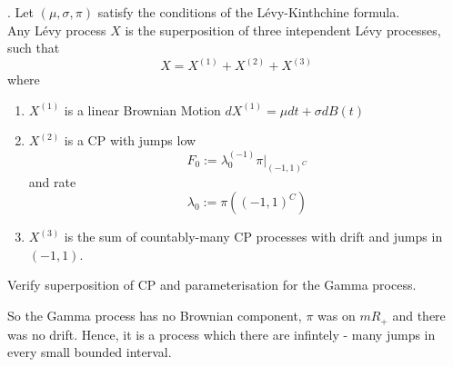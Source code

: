 \documentclass{article}
\begin{document}
	\begin{theorem}
		. Let $(\mu, \sigma, \pi)$ satisfy the conditions of the L\'evy-Kinthchine formula. \\
		Any L\'evy process $X$ is the superposition of three intependent L\'evy processes, such that 
		\begin{equation*}
			X = X^{(1)} + X^{(2)} + X^{(3)}
		\end{equation*}
		where 
		\begin{enumerate}
			\item $X^{(1)}$ is a linear Brownian Motion $dX^{(1)} = \mu dt + \sigma dB(t)$
			\item $X^{(2)}$ is a CP with jumps low
			\begin{equation*}
				F_0:=\lambda_0^{(-1)} \pi |_{(-1,1)^C}
			\end{equation*}
			and rate 
			\begin{equation*}
				\lambda_0 := \pi((-1,1)^C)
			\end{equation*}
			\item $X^{(3)}$ is the sum of countably-many CP processes with drift and jumps in $(-1,1)$. 
		\end{enumerate}
	\end{theorem}
	\begin{exercise}
		Verify superposition of CP and parameterisation for the Gamma process. 
	\end{exercise}
	 So the Gamma process has no Brownian component, $\pi$ was on $mR_+$ and there was no drift. Hence, it is a process which there are infintely - many jumps in every small bounded interval. \\
\end{document}
